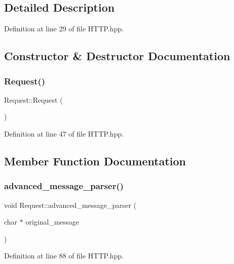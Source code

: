 \subsection{Detailed Description}


Definition at line 29 of file H\+T\+T\+P.\+hpp.



\subsection{Constructor \& Destructor Documentation}
\mbox{\label{class_request_afaf8d8928de7ffff8a3767589489bd33}} 
\subsubsection{\texorpdfstring{Request()}{Request()}}
{\footnotesize\ttfamily Request\+::\+Request (\begin{DoxyParamCaption}{ }\end{DoxyParamCaption})}



Definition at line 47 of file H\+T\+T\+P.\+hpp.



\subsection{Member Function Documentation}
\mbox{\label{class_request_a6633a3bac0300e17f356302d6b658ef2}} 
\subsubsection{\texorpdfstring{advanced\+\_\+message\+\_\+parser()}{advanced\_message\_parser()}}
{\footnotesize\ttfamily void Request\+::advanced\+\_\+message\+\_\+parser (\begin{DoxyParamCaption}\item[{char $\ast$}]{original\+\_\+message }\end{DoxyParamCaption})}



Definition at line 88 of file H\+T\+T\+P.\+hpp.

